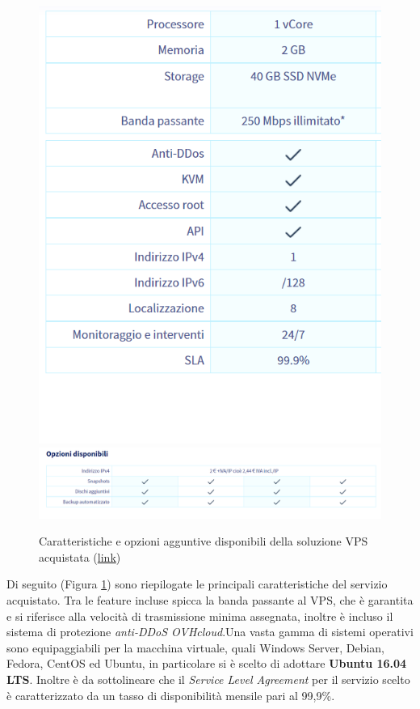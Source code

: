 \begin{figure}[ht]
	\centering
	\includegraphics[scale=0.6]{immagini/specifiche_ovh_essential.png}
	\includegraphics[scale=0.5]{immagini/opzioni_ovh_essential.png}
	\caption{Caratteristiche e opzioni agguntive disponibili della soluzione VPS acquistata
		(\href{https://www.ovhcloud.com/it/vps/compare/}{link})}
	\label{fig:caratteristiche_vps}
\end{figure}
Di seguito (Figura \ref{fig:caratteristiche_vps}) sono riepilogate le principali caratteristiche del servizio acquistato.
Tra le feature incluse spicca la banda passante al VPS, che è garantita e si riferisce alla velocità di trasmissione minima assegnata, inoltre è incluso il sistema di protezione \textit{anti-DDoS OVHcloud}.\hfill\break Una vasta gamma di sistemi operativi sono equipaggiabili per la macchina virtuale, quali Windows Server, Debian, Fedora, CentOS ed Ubuntu, in particolare si è scelto di adottare \textbf{Ubuntu 16.04 LTS}. Inoltre è da sottolineare che il \textit{Service Level Agreement} per il servizio scelto è caratterizzato da un tasso di disponibilità mensile pari al 99,9\%.\hfill\break
